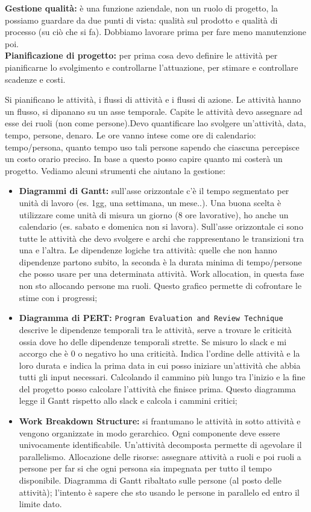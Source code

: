 \textbf{Gestione qualità:} è una funzione aziendale, non un ruolo di progetto, la possiamo guardare da due punti di vista: qualità sul prodotto e qualità di processo (su ciò che si fa). Dobbiamo lavorare prima per fare meno manutenzione poi.\\

\textbf{Pianificazione di progetto:} per prima cosa devo definire le attività per pianificarne lo svolgimento e controllarne l'attuazione, per stimare e controllare scadenze e costi.

Si pianificano le attività, i flussi di attività e i flussi di azione. Le attività hanno un flusso, si dipanano su un asse temporale. Capite le attività devo assegnare ad esse dei ruoli (non come persone).Devo quantificare lao svolgere un'attività, data, tempo, persone, denaro. Le ore vanno intese come ore di calendario: tempo/persona, quanto tempo uso tali persone sapendo che ciascuna percepisce un costo orario preciso. In base a questo posso capire quanto mi costerà un progetto. Vediamo alcuni strumenti che aiutano la gestione:
\begin{itemize}
	\item \textbf{Diagrammi di Gantt:} sull'asse orizzontale c'è il tempo segmentato per unità di lavoro (es. 1gg, una settimana, un mese..). Una buona scelta è utilizzare come unità di misura un giorno (8 ore lavorative), ho anche un calendario (es. sabato e domenica non si lavora). Sull'asse orizzontale ci sono tutte le attività che devo svolgere e archi che rappresentano le transizioni tra una e l'altra. Le dipendenze logiche tra attività: quelle che non hanno dipendenze partono subito, la seconda è la durata minima di tempo/persone che posso usare per una determinata attività. Work allocation, in questa fase non sto allocando persone ma ruoli. Questo grafico permette di cofrontare le stime con i progressi;
	\item \textbf{Diagramma di PERT:} \texttt{Program Evaluation and Review Technique} descrive le dipendenze temporali tra le attività, serve a trovare le criticità ossia dove ho delle dipendenze temporali strette. Se misuro lo slack e mi accorgo che è 0 o negativo ho una criticità. Indica l'ordine delle attività e la loro durata e indica la prima data in cui posso iniziare un'attività che abbia tutti gli input necessari. Calcolando il cammino più lungo tra l'inizio e la fine del progetto posso calcolare l'attività che finisce prima. Questo diagramma legge il Gantt rispetto allo slack e calcola i cammini critici;
	\item \textbf{Work Breakdown Structure:} si frantumano le attività in sotto attività e vengono organizzate in modo gerarchico. Ogni componente deve essere univocamente identificabile. Un'attività decomposta permette di agevolare il parallelismo.  Allocazione delle risorse: assegnare attività a ruoli e poi ruoli a persone per far si che ogni persona sia impegnata per tutto il tempo disponibile. Diagramma di Gantt ribaltato sulle persone (al posto delle attività); l'intento è sapere che sto usando le persone in parallelo ed entro il limite dato.
\end{itemize}

